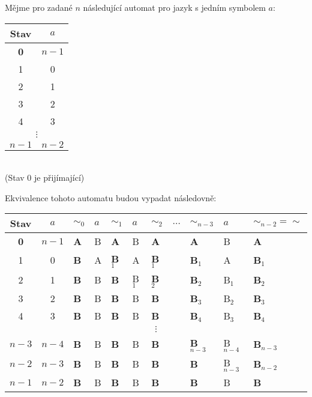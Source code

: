 \documentclass{scrartcl}
\begin{document}
    Mějme pro zadané $n$ následující automat pro jazyk s jedním symbolem $a$:
    \begin{center}
        \begin{tabular}{| c | c |}
            \hline
            Stav    & $a$ \\
            \hline
            \textbf{0}& $n-1$ \\
            1       & 0       \\
            2       & 1       \\
            3       & 2       \\
            4       & 3       \\
            \multicolumn{2}{|c|}{$\vdots$}\\
            $n-1$   & $n-2$   \\ \hline
        \end{tabular} \\

        (Stav 0 je přijímající)
    \end{center}

    Ekvivalence tohoto automatu budou vypadat následovně:
    \begin{center}
        \begin{tabular}{|c|c|>{\bfseries}l|l|>{\bfseries}l|l|>{\bfseries}l|l|>{\bfseries}l|l|>{\bfseries}l|}
            \hline
            Stav       & $a$ & $\sim_0$ & $a$ & $\sim_1$ & $a$ & $\sim_2$ & $\dots$ & $\sim_{n-3}$ & $a$ & $\sim_{n-2}=\sim$\\
            \hline
            \textbf{0} &$n-1$& A        & B   & A        & B   & A        &         & A            & B   & A\\      
            1          & 0   & B        & A   & B$_1$    & A   & B$_1$    &         & B$_1$        & A   & B$_1$\\    
            2          & 1   & B        & B   & B        &B$_1$& B$_2$    &         & B$_2$        &B$_1$& B$_2$\\    
            3          & 2   & B        & B   & B        & B   & B        &         & B$_3$        &B$_2$& B$_3$\\
            4          & 3   & B        & B   & B        & B   & B        &         & B$_4$        &B$_3$& B$_4$\\
            \multicolumn{11}{|c|}{$\vdots$} \\
            $n-3$      &$n-4$& B        & B   & B        & B   & B        &         & B$_{n-3}$    &B$_{n-4}$& B$_{n-3}$\\
            $n-2$      &$n-3$& B        & B   & B        & B   & B        &         & B            &B$_{n-3}$& B$_{n-2}$\\
            $n-1$      &$n-2$& B        & B   & B        & B   & B        &         & B            &B        & B\\   
            \hline
        \end{tabular}
    \end{center}
\end{document}
